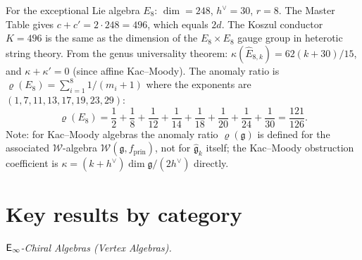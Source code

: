 \begin{remark}\label{rem:e8-complementarity}
For the exceptional Lie algebra $E_8$: $\dim = 248$, $h^\vee = 30$, $r = 8$.  The Master Table gives $c + c' = 2 \cdot 248 = 496$, which equals $2d$.  The Koszul conductor $K = 496$ is the same as the dimension of the $E_8 \times E_8$ gauge group in heterotic string theory.  From the genus universality theorem: $\kappa(\widehat{E}_{8,k}) = 62(k+30)/15$, and $\kappa + \kappa' = 0$ (since affine Kac--Moody).  The anomaly ratio is $\varrho(E_8) = \sum_{i=1}^8 1/(m_i+1)$ where the exponents are $(1,7,11,13,17,19,23,29)$:
\[
\varrho(E_8) = \frac{1}{2} + \frac{1}{8} + \frac{1}{12} + \frac{1}{14} + \frac{1}{18} + \frac{1}{20} + \frac{1}{24} + \frac{1}{30} = \frac{121}{126}.
\]
Note: for Kac--Moody algebras the anomaly ratio $\varrho(\mathfrak{g})$ is defined for the associated $\mathcal{W}$-algebra $\mathcal{W}(\mathfrak{g}, f_{\mathrm{prin}})$, not for $\widehat{\mathfrak{g}}_k$ itself; the Kac--Moody obstruction coefficient is $\kappa = (k+h^\vee)\dim\mathfrak{g}/(2h^\vee)$ directly.
\end{remark}

\section*{Key results by category}

\emph{$\mathsf{E}_{\infty}$-Chiral Algebras (Vertex Algebras).}

